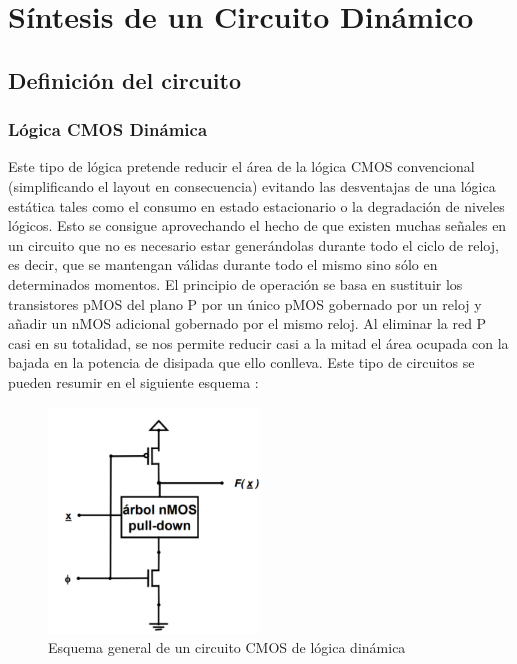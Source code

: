 \renewcommand{\chaptername}{Sección}
\chapter{Síntesis de un Circuito Dinámico}\label{ch:ch2label}
\section{Definición del circuito}
\subsection{Lógica CMOS Dinámica}
Este tipo de lógica pretende reducir el área de la lógica CMOS convencional (simplificando el layout en consecuencia) evitando las desventajas de una lógica estática tales como el consumo en estado estacionario o la degradación de niveles lógicos.
\newline Esto se consigue aprovechando el hecho de que existen muchas señales en un circuito que no es necesario estar generándolas durante todo el ciclo de reloj, es decir, que se mantengan válidas durante todo el mismo sino sólo en determinados momentos.
\newline El principio de operación se basa en sustituir los transistores pMOS del plano P por un único pMOS gobernado por un reloj y añadir un nMOS adicional gobernado por el mismo reloj. Al eliminar la red P casi en su totalidad, se nos permite reducir casi a la mitad el área ocupada con la bajada en la potencia de disipada que ello conlleva.
\newline Este tipo de circuitos se pueden resumir en el siguiente esquema \cite{TheoryImages}:
\begin{figure}[h]%
\begin{center}
\includegraphics[width=0.5\textwidth]{figures/DynamicBasic.PNG}
\caption{Esquema general de un circuito CMOS de lógica dinámica}
\label{fig:DynBasic}
\end{center}
\end{figure}
